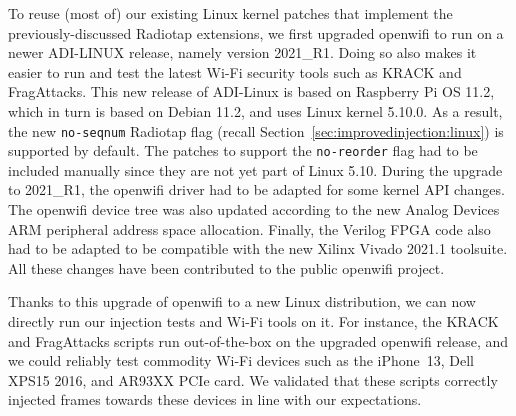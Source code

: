 \documentclass[sigconf]{acmart}
\newcommand{\wifi}{\mbox{Wi-Fi}}
\begin{document}
To reuse (most of) our existing Linux kernel patches that implement the previously-discussed Radiotap extensions, we first upgraded openwifi to run on a newer ADI-LINUX release, namely version 2021\_R1.
Doing so also makes it easier to run and test the latest \wifi{} security tools such as KRACK and FragAttacks.
This new release of ADI-Linux is based on Raspberry Pi OS 11.2, which in turn is based on Debian 11.2, and uses Linux kernel 5.10.0.
As a result, the new \verb|no-seqnum| Radiotap flag (recall Section~\ref{sec:improvedinjection:linux}) is supported by default.
The patches to support the \verb|no-reorder| flag had to be included manually since they are not yet part of Linux 5.10.
During the upgrade to 2021\_R1, the openwifi driver had to be adapted for some kernel API changes. %
The openwifi device tree was also updated according to the new Analog Devices ARM peripheral address space allocation.
Finally, the Verilog FPGA code also had to be adapted to be compatible with the new Xilinx Vivado 2021.1 toolsuite.
All these changes have been contributed to the public openwifi project.

Thanks to this upgrade of openwifi to a new Linux distribution, we can now directly run our injection tests and \wifi{} tools on it.
For instance, the KRACK and FragAttacks scripts run out-of-the-box on the upgraded openwifi release, and we could reliably test commodity \wifi{} devices such as the iPhone~13, Dell XPS15 2016, and AR93XX PCIe card.
We validated that these scripts correctly injected frames towards these devices in line with our expectations.

\end{document}
